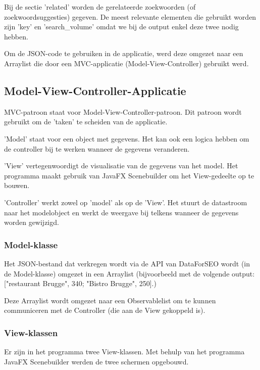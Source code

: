 Bij de sectie 'related' worden de gerelateerde zoekwoorden (of zoekwoordsuggesties) gegeven. De meest relevante elementen die gebruikt worden zijn 'key' en 'search\_volume' omdat we bij de output enkel deze twee nodig hebben. 

Om de JSON-code te gebruiken in de applicatie, werd deze omgezet naar een Arraylist die door een MVC-applicatie (Model-View-Controller) gebruikt werd. 

\subsection{Model-View-Controller-Applicatie}
\label{ch: Model-View-Controller-Applicatie}

MVC-patroon staat voor Model-View-Controller-patroon. Dit patroon wordt gebruikt om de 'taken' te scheiden van de applicatie. 

'Model' staat voor een object met gegevens. Het kan ook een logica hebben om de controller bij te werken wanneer de gegevens veranderen. 

'View' vertegenwoordigt de visualisatie van de gegevens van het model. Het programma maakt gebruik van JavaFX Scenebuilder om het View-gedeelte op te bouwen. 

'Controller' werkt zowel op 'model' als op de 'View'. Het stuurt de datastroom naar het modelobject en werkt de weergave bij telkens wanneer de gegevens worden gewijzigd.

\subsubsection{Model-klasse}
\label{ch: Model-klasse}

Het JSON-bestand dat verkregen wordt via de API van DataForSEO wordt (in de Model-klasse) omgezet in een Arraylist (bijvoorbeeld met de volgende output: ["restaurant Brugge", 340; "Bistro Brugge", 250].)

Deze Arraylist wordt omgezet naar een Observablelist om te kunnen communiceren met de Controller (die aan de View gekoppeld is). 

\subsubsection{View-klassen}
\label{ch: View-klassen}

Er zijn in het programma twee View-klassen. Met behulp van het programma JavaFX Scenebuilder werden de twee schermen opgebouwd.

